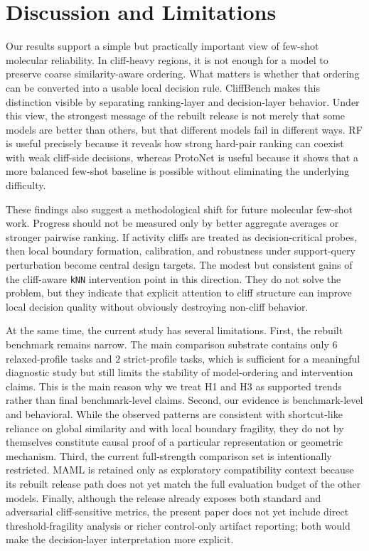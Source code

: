 \documentclass{article}
\begin{document}
\section{Discussion and Limitations}

Our results support a simple but practically important view of few-shot molecular reliability. In cliff-heavy
regions, it is not enough for a model to preserve coarse similarity-aware ordering. What matters is whether that
ordering can be converted into a usable local decision rule. CliffBench makes this distinction visible by
separating ranking-layer and decision-layer behavior. Under this view, the strongest message of the rebuilt release
is not merely that some models are better than others, but that different models fail in different ways. RF is
useful precisely because it reveals how strong hard-pair ranking can coexist with weak cliff-side decisions,
whereas ProtoNet is useful because it shows that a more balanced few-shot baseline is possible without eliminating
the underlying difficulty.

These findings also suggest a methodological shift for future molecular few-shot work. Progress should not be
measured only by better aggregate averages or stronger pairwise ranking. If activity cliffs are treated as
decision-critical probes, then local boundary formation, calibration, and robustness under support-query
perturbation become central design targets. The modest but consistent gains of the cliff-aware \texttt{kNN}
intervention point in this direction. They do not solve the problem, but they indicate that explicit attention to
cliff structure can improve local decision quality without obviously destroying non-cliff behavior.

At the same time, the current study has several limitations. First, the rebuilt benchmark remains narrow. The main
comparison substrate contains only $6$ relaxed-profile tasks and $2$ strict-profile tasks, which is sufficient for
a meaningful diagnostic study but still limits the stability of model-ordering and intervention claims. This is
the main reason why we treat H1 and H3 as supported trends rather than final benchmark-level claims. Second, our
evidence is benchmark-level and behavioral. While the observed patterns are consistent with shortcut-like reliance
on global similarity and with local boundary fragility, they do not by themselves constitute causal proof of a
particular representation or geometric mechanism. Third, the current full-strength comparison set is intentionally
restricted. MAML is retained only as exploratory compatibility context because its rebuilt release path does not
yet match the full evaluation budget of the other models. Finally, although the release already exposes both
standard and adversarial cliff-sensitive metrics, the present paper does not yet include direct threshold-fragility
analysis or richer control-only artifact reporting; both would make the decision-layer interpretation more explicit.
\end{document}

